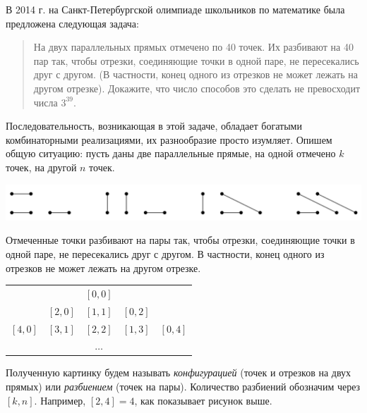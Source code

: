 \documentclass[10pt]{scrbook} \usepackage{modules/nonstahp_book}
\begin{document}







В 2014 г. на Санкт-Петербургской олимпиаде школьников по математике была предложена следующая задача:
\begin{quote}
На двух параллельных прямых отмечено по 40 точек. Их разбивают на 40 пар так, чтобы отрезки, соединяющие точки в одной паре, не пересекались друг с другом. (В частности, конец одного из отрезков не может лежать на другом отрезке). Докажите, что число способов это сделать не превосходит числа $3^{39}$.
\end{quote}
Последовательность, возникающая в этой задаче, обладает богатыми комбинаторными реализациями, их разнообразие просто изумляет. Опишем общую ситуацию: пусть даны две параллельные прямые, на одной отмечено $k$ точек, на другой $n$ точек. 
\begin{center}
\includegraphics[width=1\linewidth]{Pairs.png}%
\end{center}
Отмеченные точки разбивают на пары так, чтобы отрезки, соединяющие точки в одной паре, не пересекались друг с другом. В частности, конец одного из отрезков не может лежать на другом отрезке. 
\begin{center}
\begin{tabular}{c c c c c}
       &       &$[0,0]$&       &     \\
       &$[2,0]$&$[1,1]$&$[0,2]$&     \\
$[4,0]$&$[3,1]$&$[2,2]$&$[1,3]$&$[0,4]$ \\
       &       &$\ldots$&      &
\end{tabular}
\end{center}
Полученную картинку будем называть {\it конфигурацией} (точек и отрезков на двух прямых) или {\it разбиением} (точек на пары). Количество разбиений обозначим через $[k,n]$. Например, $[2,4] = 4$, как показывает рисунок выше.
\end{document}
